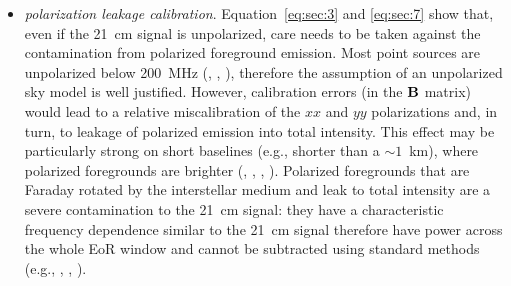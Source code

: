 \begin{itemize}
\item {\it polarization leakage calibration}. Equation~\ref{eq:sec:3} and \ref{eq:sec:7} show that, even if the 21~cm signal is unpolarized, care needs to be taken against the contamination from polarized foreground emission. Most point sources are unpolarized below 200~MHz (\cite{bernardi13}, \cite{lenc16}, \cite{vaneck18}), therefore the assumption of an unpolarized sky model is well justified. However, calibration errors (in the ${\bf B}$ matrix) would lead  to a relative miscalibration of the $xx$ and $yy$ polarizations and, in turn, to leakage of polarized emission into total intensity. This effect may be particularly strong on short baselines (e.g., shorter than a $\sim 1$~km), where polarized foregrounds are brighter (\cite{bernardi09}, \cite{iacobelli13}, \cite{jelic15}, \cite{lenc16}). Polarized foregrounds that are Faraday rotated by the interstellar medium and leak to total intensity are a severe contamination to the 21~cm signal: they have a characteristic frequency dependence similar to the 21~cm signal therefore have power across the whole EoR window and cannot be subtracted using standard methods (e.g., \cite{jelic10}, \cite{moore13}, \cite{nunhokee17}).  


\end{itemize}
